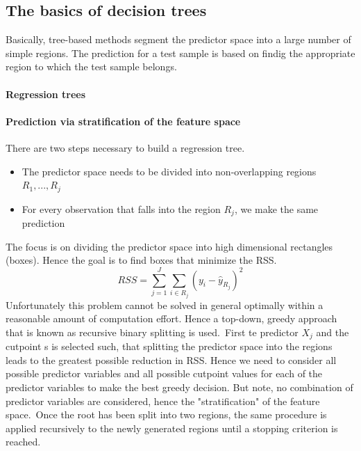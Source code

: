 \documentclass[../document.tex]{subfiles}
\begin{document}
	\subsection{The basics of decision trees}
	Basically, tree-based methods segment the predictor space into a large number of simple regions. The prediction for a test sample is based on findig the appropriate region to which the test sample belongs.

	\paragraph{Regression trees}

	\paragraph{Prediction via stratification of the feature space}
	There are two steps necessary to build a regression tree.
	\begin{itemize}
		\item The predictor space needs to be divided into non-overlapping regions \(R_{1},...,R_{j}\)
		\item For every observation that falls into the region \(R_{j}\), we make the same prediction
	\end{itemize}
	The focus is on dividing the predictor space into high dimensional rectangles (boxes). Hence the goal is to find boxes that minimize the RSS.
	\begin{equation}
		RSS = \sum_{j=1}^{J}\sum_{i\in R_{j}}(y_{i}-\hat{y}_{R_{j}})^2
	\end{equation}
	Unfortunately this problem cannot be solved in general optimally within a reasonable amount of computation effort. Hence a top-down, greedy approach that is known as recursive binary splitting is used.\
	First te predictor \(X_{j}\) and the cutpoint s is selected such, that splitting the predictor space into the regions leads to the greatest possible reduction in RSS. Hence we need to consider all possible predictor variables and all possible cutpoint values for each of the predictor variables to make the best greedy decision. But note, no combination of predictor variables are considered, hence the "stratification" of the feature space.\
	Once the root has been split into two regions, the same procedure is applied recursively to the newly generated regions until a stopping criterion is reached.
\end{document}
